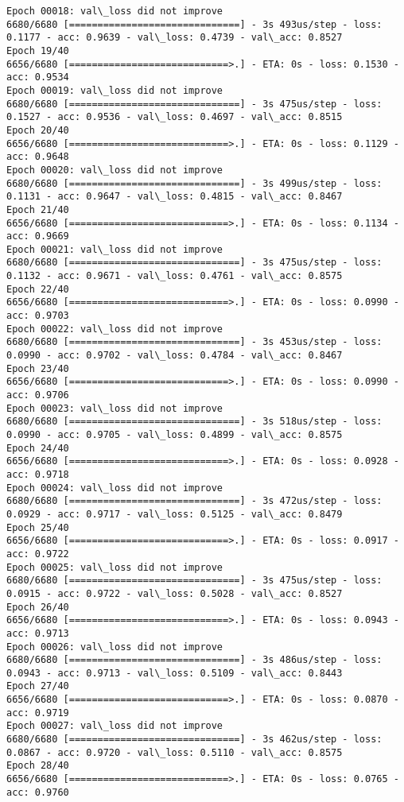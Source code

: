 \documentclass[11pt]{article}
\begin{document}
\begin{Verbatim}[commandchars=\\\{\}]
Epoch 00018: val\_loss did not improve
6680/6680 [==============================] - 3s 493us/step - loss: 0.1177 - acc: 0.9639 - val\_loss: 0.4739 - val\_acc: 0.8527
Epoch 19/40
6656/6680 [============================>.] - ETA: 0s - loss: 0.1530 - acc: 0.9534
Epoch 00019: val\_loss did not improve
6680/6680 [==============================] - 3s 475us/step - loss: 0.1527 - acc: 0.9536 - val\_loss: 0.4697 - val\_acc: 0.8515
Epoch 20/40
6656/6680 [============================>.] - ETA: 0s - loss: 0.1129 - acc: 0.9648
Epoch 00020: val\_loss did not improve
6680/6680 [==============================] - 3s 499us/step - loss: 0.1131 - acc: 0.9647 - val\_loss: 0.4815 - val\_acc: 0.8467
Epoch 21/40
6656/6680 [============================>.] - ETA: 0s - loss: 0.1134 - acc: 0.9669
Epoch 00021: val\_loss did not improve
6680/6680 [==============================] - 3s 475us/step - loss: 0.1132 - acc: 0.9671 - val\_loss: 0.4761 - val\_acc: 0.8575
Epoch 22/40
6656/6680 [============================>.] - ETA: 0s - loss: 0.0990 - acc: 0.9703
Epoch 00022: val\_loss did not improve
6680/6680 [==============================] - 3s 453us/step - loss: 0.0990 - acc: 0.9702 - val\_loss: 0.4784 - val\_acc: 0.8467
Epoch 23/40
6656/6680 [============================>.] - ETA: 0s - loss: 0.0990 - acc: 0.9706
Epoch 00023: val\_loss did not improve
6680/6680 [==============================] - 3s 518us/step - loss: 0.0990 - acc: 0.9705 - val\_loss: 0.4899 - val\_acc: 0.8575
Epoch 24/40
6656/6680 [============================>.] - ETA: 0s - loss: 0.0928 - acc: 0.9718
Epoch 00024: val\_loss did not improve
6680/6680 [==============================] - 3s 472us/step - loss: 0.0929 - acc: 0.9717 - val\_loss: 0.5125 - val\_acc: 0.8479
Epoch 25/40
6656/6680 [============================>.] - ETA: 0s - loss: 0.0917 - acc: 0.9722
Epoch 00025: val\_loss did not improve
6680/6680 [==============================] - 3s 475us/step - loss: 0.0915 - acc: 0.9722 - val\_loss: 0.5028 - val\_acc: 0.8527
Epoch 26/40
6656/6680 [============================>.] - ETA: 0s - loss: 0.0943 - acc: 0.9713
Epoch 00026: val\_loss did not improve
6680/6680 [==============================] - 3s 486us/step - loss: 0.0943 - acc: 0.9713 - val\_loss: 0.5109 - val\_acc: 0.8443
Epoch 27/40
6656/6680 [============================>.] - ETA: 0s - loss: 0.0870 - acc: 0.9719
Epoch 00027: val\_loss did not improve
6680/6680 [==============================] - 3s 462us/step - loss: 0.0867 - acc: 0.9720 - val\_loss: 0.5110 - val\_acc: 0.8575
Epoch 28/40
6656/6680 [============================>.] - ETA: 0s - loss: 0.0765 - acc: 0.9760

\end{Verbatim}
\end{document}
